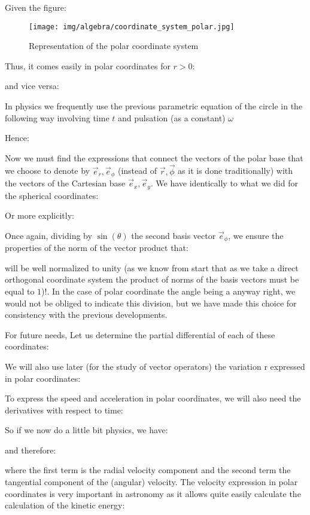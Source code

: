 	Given the figure:
	\begin{figure}[H]
		\centering
		\texttt{[image: img/algebra/coordinate\_system\_polar.jpg]}
		\caption{Representation of the polar coordinate system}
	\end{figure}
	Thus, it comes easily in polar coordinates for $r>0$:
	
	and vice versa:
	
	\begin{tcolorbox}[title=Remark,colframe=black,arc=10pt]
	In physics we frequently use the previous parametric equation of the circle in the following way involving time $t$ and pulsation (as a constant) $\omega$\label{vector parametric circle equation}
	
	Hence:
	
	\end{tcolorbox}
	Now we must find the expressions that connect the vectors of the polar base that we choose to denote by $\vec{e}_r,\vec{e}_\phi$ (instead of $\vec{r}, \vec{\phi}$ as it is done traditionally) with the vectors of the Cartesian base $\vec{e}_x,\vec{e}_y$. We have identically to what we did for the spherical coordinates:
	
	Or more explicitly:
	
	Once again, dividing by $\sin(\theta)$ the second basis vector $\vec{e}_\phi$, we ensure the properties of the norm of the vector product that:
	
	will be well normalized to unity (as we know from start that as we take a direct orthogonal coordinate system the product of norms of the basis vectors must be equal to $1$)!. In the case of polar coordinate the angle being a anyway right, we would not be obliged to indicate this division, but we have made this choice for consistency with the previous developments.
	
	For future needs, Let us determine the partial differential of each of these coordinates:
	
	We will also use later (for the study of vector operators) the variation $\mathrm{r}$ expressed in polar coordinates:
	
	To express the speed and acceleration in polar coordinates, we will also need the derivatives with respect to time:
	
	So if we now do a little bit physics, we have:
	
	and therefore:
	
	where the first term is the radial velocity component and the second term the tangential component of the (angular) velocity. The velocity expression in polar coordinates is very important in astronomy as it allows quite easily calculate the calculation of the kinetic energy:
	
